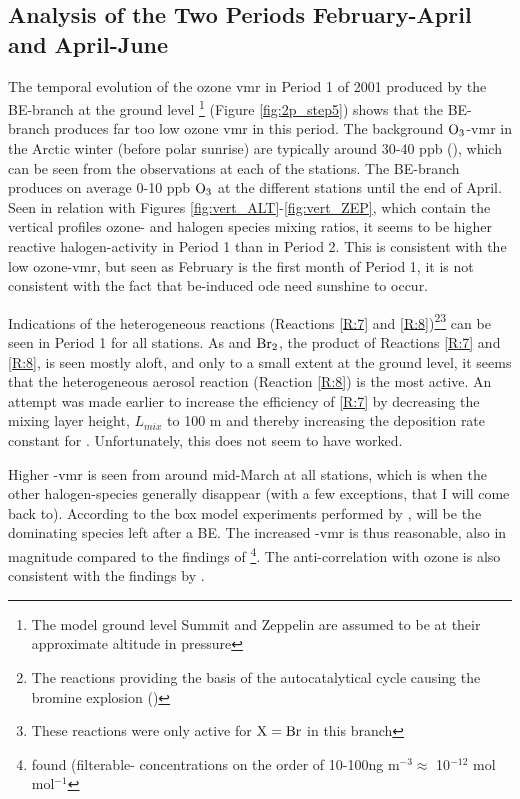 \subsection{Analysis of the Two Periods February-April and April-June}\label{sec:disc_twoPeriods}

The temporal evolution of the ozone \acrshort{vmr} in Period 1 of 2001 produced by the BE-branch at the ground level \footnote{The model ground level Summit and Zeppelin are assumed to be at their approximate altitude in pressure} (Figure \ref{fig:2p_step5}) shows that the BE-branch produces far too low ozone \acrshort{vmr} in this period. The background $\mathrm{O_3}$-\acrshort{vmr} in the Arctic winter (before polar sunrise) are typically around 30-40 ppb (\cite{Foster2001}), which can be seen from the observations at each of the stations. The BE-branch produces on average 0-10 ppb $\mathrm{O_3}$ at the different stations until the end of April. Seen in relation with Figures \ref{fig:vert_ALT}-\ref{fig:vert_ZEP}, which contain the vertical profiles ozone- and halogen species mixing ratios, it seems to be higher reactive halogen-activity in Period 1 than in Period 2. This is consistent with the low ozone-\acrshort{vmr}, but seen as February is the first month of Period 1, it is not consistent with the fact that \acrshort{be}-induced \acrshort{ode} need sunshine to occur. 

\medskip

Indications of the heterogeneous reactions (Reactions \ref{R:7} and \ref{R:8})\footnote{The reactions providing the basis of the autocatalytical cycle causing the bromine explosion (\cite{Simpson2015})}\footnote{These reactions were only active for $\mathrm{X} = \mathrm{Br}$ in this branch} can be seen in Period 1 for all stations. As  and $\mathrm{Br_2}$, the product of Reactions \ref{R:7} and \ref{R:8}, is seen mostly aloft, and only to a small extent at the ground level, it seems that the heterogeneous aerosol reaction (Reaction \ref{R:8}) is the most active. An attempt was made earlier to increase the efficiency of \ref{R:7} by decreasing the mixing layer height, $L_{mix}$ to 100 m and thereby increasing the deposition rate constant for . Unfortunately, this does not seem to have worked. 

\medskip

Higher -\acrshort{vmr} is seen from around mid-March at all stations, which is when the other halogen-species generally disappear (with a few exceptions, that I will come back to). According to the box model experiments performed by \cite{CAO},  will be the dominating species left after a BE. The increased -\acrshort{vmr} is thus reasonable, also in magnitude compared to the findings of \cite{barrie}\footnote{\cite{barrie} found  (filterable- concentrations on the order of 10-100ng m$^{-3} \approx$ 10$^{-12}$ mol mol$^{-1}$}. The anti-correlation with ozone is also consistent with the findings by \cite{barrie}. 

